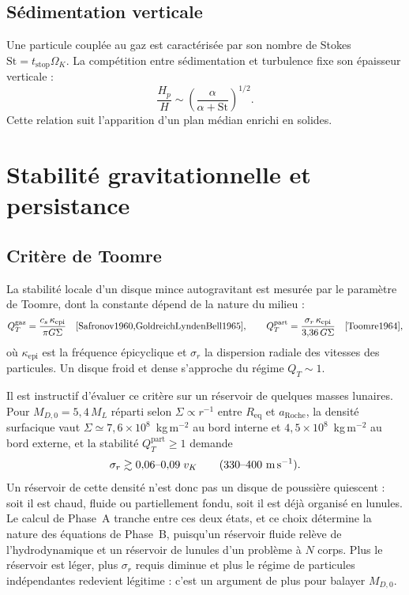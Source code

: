 \documentclass[11pt,a4paper,openany]{report}
\newcommand{\Req}{R_{\mathrm{eq}}}
\newcommand{\aR}{a_{\mathrm{Roche}}}
\begin{document}
\subsection{Sédimentation verticale}

Une particule couplée au gaz est caractérisée par son nombre de Stokes
$\mathrm{St}=t_{\mathrm{stop}}\Omega_K$. La compétition entre sédimentation et turbulence fixe
son épaisseur verticale :
\begin{equation}
\frac{H_p}{H}\sim\left(\frac{\alpha}{\alpha+\mathrm{St}}\right)^{1/2}.
\label{eq:Hp}
\end{equation}
Cette relation suit l'apparition d'un plan médian enrichi en solides.


\section{Stabilité gravitationnelle et persistance}
\subsection{Critère de Toomre}

La stabilité locale d'un disque mince autogravitant est mesurée par le paramètre de Toomre,
dont la constante dépend de la nature du milieu :
\begin{equation}
Q_T^{\mathrm{gaz}}=\frac{c_s\,\kappa_{\mathrm{epi}}}{\pi G\Sigma}
\quad\text{\cite{Safronov1960,GoldreichLyndenBell1965}},
\qquad
Q_T^{\mathrm{part}}=\frac{\sigma_r\,\kappa_{\mathrm{epi}}}{3{,}36\,G\Sigma}
\quad\text{\cite{Toomre1964}},
\label{eq:Toomre}
\end{equation}
où $\kappa_{\mathrm{epi}}$ est la fréquence épicyclique et $\sigma_r$ la dispersion radiale des
vitesses des particules. Un disque froid et dense s'approche du régime $Q_T\sim1$.

Il est instructif d'évaluer ce critère sur un réservoir de quelques masses lunaires. Pour
$M_{D,0}=5{,}4\,M_L$ réparti selon $\Sigma\propto r^{-1}$ entre $\Req$ et $\aR$, la densité
surfacique vaut $\Sigma\simeq7{,}6\times10^{8}$~kg\,m$^{-2}$ au bord interne et
$4{,}5\times10^{8}$~kg\,m$^{-2}$ au bord externe, et la stabilité $Q_T^{\mathrm{part}}\ge1$ demande
\begin{equation}
\sigma_r\gtrsim0{,}06\text{--}0{,}09\;v_K\qquad(330\text{--}400\ \text{m\,s}^{-1}).
\label{eq:sigmar-reservoir}
\end{equation}
Un réservoir de cette densité n'est donc pas un disque de poussière quiescent : soit il est chaud,
fluide ou partiellement fondu, soit il est déjà organisé en lunules. Le calcul de Phase~A tranche
entre ces deux états, et ce choix détermine la nature des équations de Phase~B, puisqu'un réservoir
fluide relève de l'hydrodynamique et un réservoir de lunules d'un problème à $N$ corps. Plus le
réservoir est léger, plus $\sigma_r$ requis diminue et plus le régime de particules indépendantes
redevient légitime : c'est un argument de plus pour balayer $M_{D,0}$.
\end{document}
